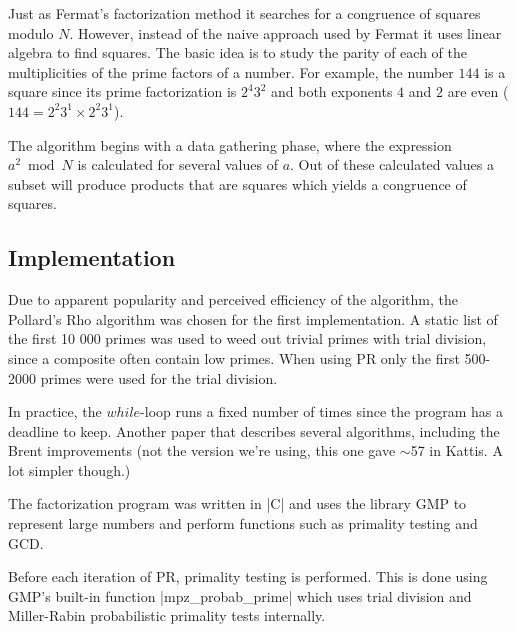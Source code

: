 \documentclass[paper=a4, fontsize=11pt,numbers=endperiod]{scrartcl} %
\numberwithin{equation}{section} %
\numberwithin{figure}{section} %
\numberwithin{table}{section} %
\begin{document}
Just as Fermat's factorization method it searches for a congruence of squares modulo $N$. However, instead of the naive approach used by Fermat it uses linear algebra to find squares. The basic idea is to study the parity of each of the multiplicities of the prime factors of a number. For example, the number $144$ is a square since its prime factorization is $2^{4}3^2$ and both exponents $4$ and $2$ are even ($144 = 2^2 3^1\times2^2 3^1$).

The algorithm begins with a data gathering phase, where the expression $a^2 \bmod N$ is calculated for several values of $a$.
Out of these calculated values a subset will produce products that are squares which yields a congruence of squares.

\subsection{Implementation}
Due to apparent popularity and perceived efficiency of the algorithm, the Pollard's Rho algorithm was chosen for the first implementation.
A static list of the first 10 000 primes was used to weed out trivial primes with trial division, since a composite often contain low primes.
When using PR only the first 500-2000 primes were used for the trial division.

In practice, the $while$-loop runs a fixed number of times since the program has a deadline to keep.
Another paper that describes several algorithms, including the Brent improvements (not the version we're using, this one gave $\sim$57 in Kattis.
A lot simpler though.)\cite{otherpaper} %

The factorization program was written in |C| and uses the library GMP\cite{gmp} to represent large numbers and perform functions such as primality testing and GCD.

Before each iteration of PR, primality testing is performed.
This is done using GMP's built-in function |mpz_probab_prime| which uses trial division and Miller-Rabin probabilistic primality tests internally.\cite{probabprime}


\end{document}

